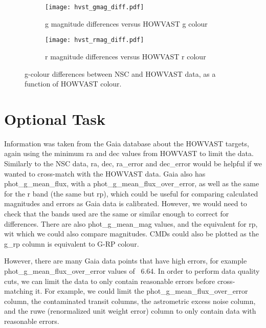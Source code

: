 \documentclass{article}
\begin{document}
\begin{figure}[ht!]
\begin{subfigure}{.5\textwidth}
  \centering
  \texttt{[image: hvst\_gmag\_diff.pdf]}
  \caption{g magnitude differences versus HOWVAST g colour}
  \label{fig:hvstdiff1}
\end{subfigure}%
\begin{subfigure}{.5\textwidth}
  \centering
  \texttt{[image: hvst\_rmag\_diff.pdf]}
  \caption{r magnitude differences versus HOWVAST r colour}
  \label{fig:hvstdiff2}
\end{subfigure}
\caption{g-colour differences between NSC and HOWVAST data, as a function of HOWVAST colour.}
\label{fig:hvstdiff}
\end{figure}

 


\section*{Optional Task}

Information was taken from the Gaia database about the HOWVAST targets, again using the minimum ra and dec values from HOWVAST to limit the data. Similarly to the NSC data, ra, dec, ra\_error and dec\_error would be helpful if we wanted to cross-match with the HOWVAST data. Gaia also has phot\_g\_mean\_flux, with a phot\_g\_mean\_flux\_over\_error, as well as the same for the r band (the same but rp), which could be useful for comparing calculated magnitudes and errors as Gaia data is calibrated. However, we would need to check that the bands used are the same or similar enough to correct for differences. There are also phot\_g\_mean\_mag values, and the equivalent for rp, wit which we could also compare magnitudes. CMDs could also be plotted as the g\_rp column is equivalent to G-RP colour. 

However, there are many Gaia data points that have high errors, for example phot\_g\_mean\_flux\_over\_error values of ~6.64. In order to perform data quality cuts, we can limit the data to only contain reasonable errors before cross-matching it. For example, we could limit the phot\_g\_mean\_flux\_over\_error column, the contaminated transit columns, the astrometric excess noise column, and the ruwe (renormalized unit weight error) column to only contain data with reasonable errors. 
\end{document}
